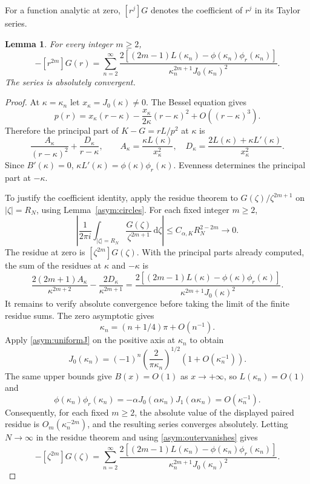 \documentclass[11pt,letterpaper,reqno]{amsart}
\newtheorem{lemma}[theorem]{Lemma}
\theoremstyle{definition}
\newcommand{\dd}{\,\mathrm d}
\begin{document}
For a function analytic at zero, $[r^j]G$ denotes the coefficient of $r^j$ in its Taylor series.
\begin{lemma}
For every integer $m\ge2$,
\begin{equation}\label{gm:resformula}
 -[r^{2m}]G(r)=\sum_{n=2}^{\infty}
 \frac{2[(2m-1)L(\kappa_n)-\phi(\kappa_n)\phi_r(\kappa_n)]}
 {\kappa_n^{2m+1}J_0(\kappa_n)^2}.
\end{equation}
The series is absolutely convergent.
\end{lemma}
\begin{proof}
At $\kappa=\kappa_n$ let $x_\kappa=J_0(\kappa)\ne0$.
The Bessel equation gives
\[
 p(r)=x_\kappa(r-\kappa)
       -\frac{x_\kappa}{2\kappa}(r-\kappa)^2
       +O((r-\kappa)^3).
\]
Therefore the principal part of $K-G=rL/p^2$ at $\kappa$ is
\[
 \frac{A_\kappa}{(r-\kappa)^2}
    +\frac{D_\kappa}{r-\kappa},\qquad
 A_\kappa=\frac{\kappa L(\kappa)}{x_\kappa^2},\quad
 D_\kappa=\frac{2L(\kappa)+\kappa L'(\kappa)}{x_\kappa^2}.
\]
Since $B'(\kappa)=0$,
$\kappa L'(\kappa)=\phi(\kappa)\phi_r(\kappa)$.
Evenness determines the principal part at $-\kappa$.

To justify the coefficient identity, apply the residue theorem to
$G(\zeta)/\zeta^{2m+1}$ on $|\zeta|=R_N$, using Lemma~\ref{asym:circles}.
For each fixed integer $m\ge2$,
\begin{equation}\label{asym:outervanishes}
 \left|\frac1{2\pi i}\int_{|\zeta|=R_N}\frac{G(\zeta)}{\zeta^{2m+1}}\dd\zeta\right|
       \le C_{\alpha,K}R_N^{2-2m}\longrightarrow0.
\end{equation}
The residue at zero is $[\zeta^{2m}]G(\zeta)$. With the principal parts already
computed, the sum of the residues at $\kappa$ and $-\kappa$ is
\[
 \frac{2(2m+1)A_\kappa}{\kappa^{2m+2}}
       -\frac{2D_\kappa}{\kappa^{2m+1}}
 =\frac{2[(2m-1)L(\kappa)-\phi(\kappa)\phi_r(\kappa)]}
        {\kappa^{2m+1}J_0(\kappa)^2}.
\]
It remains to verify absolute convergence before taking the limit of
the finite residue sums. The zero asymptotic
\cite[Eq.~10.21.19]{DLMF}
gives
\[
 \kappa_n=(n+1/4)\pi+O(n^{-1}).
\]
Apply \eqref{asym:uniformJ} on the positive axis at $\kappa_n$ to obtain
\[
 J_0(\kappa_n)=(-1)^n\left(\frac{2}{\pi\kappa_n}\right)^{1/2}
                         (1+O(\kappa_n^{-1})).
\]
The same upper bounds give $B(x)=O(1)$ as $x\to+\infty$, so
$L(\kappa_n)=O(1)$ and
\[
 \phi(\kappa_n)\phi_r(\kappa_n)
   =-\alpha J_0(\alpha\kappa_n)J_1(\alpha\kappa_n)
   =O(\kappa_n^{-1}).
\]
Consequently, for each fixed $m\ge2$, the absolute value of the
displayed paired residue is $O_m(\kappa_n^{-2m})$, and the resulting
series converges absolutely. Letting $N\to\infty$ in the residue
theorem and using \eqref{asym:outervanishes} gives
\[
 -[\zeta^{2m}]G(\zeta)=\sum_{n=2}^{\infty}
 \frac{2[(2m-1)L(\kappa_n)-\phi(\kappa_n)\phi_r(\kappa_n)]}
        {\kappa_n^{2m+1}J_0(\kappa_n)^2}.
\]

\end{proof}
\end{document}
